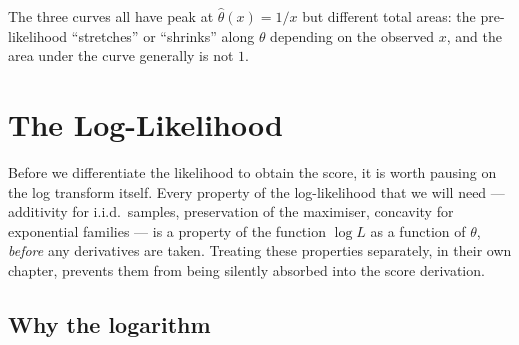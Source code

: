 \documentclass[a4paper,oneside,12pt]{extarticle}
\theoremstyle{plain}
\theoremstyle{definition}
\theoremstyle{remark}
\begin{document}
\begin{center}
\end{center}

The three curves all have peak at $\hat\theta(x) = 1/x$ but different
total areas: the pre-likelihood ``stretches'' or ``shrinks'' along
$\theta$ depending on the observed $x$, and the area under the curve
generally is not $1$.

\section{The Log-Likelihood}
\label{sec:loglikelihood_chapter}

Before we differentiate the likelihood to obtain the score, it is
worth pausing on the log transform itself.  Every property of the
log-likelihood that we will need --- additivity for i.i.d.\ samples,
preservation of the maximiser, concavity for exponential families ---
is a property of the function $\log L$ as a function of $\theta$,
\emph{before} any derivatives are taken.  Treating these properties
separately, in their own chapter, prevents them from being
silently absorbed into the score derivation.

\subsection{Why the logarithm}
\end{document}
